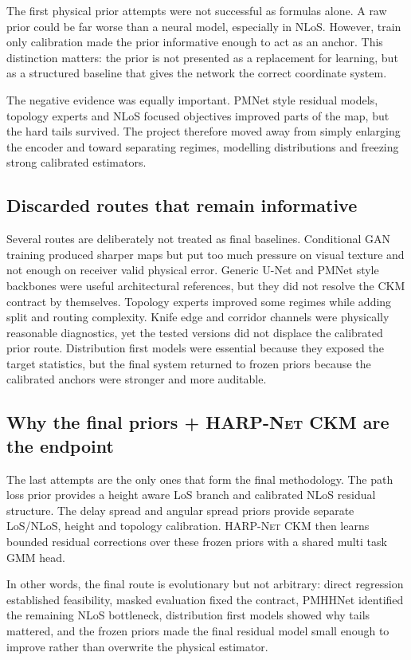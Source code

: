 The first physical prior attempts were not successful as formulas alone. A raw
prior could be far worse than a neural model, especially in NLoS. However,
train only calibration made the prior informative enough to act as an anchor.
This distinction matters: the prior is not presented as a replacement for
learning, but as a structured baseline that gives the network the correct
coordinate system.

The negative evidence was equally important. PMNet style residual models,
topology experts and NLoS focused objectives improved parts of the map, but
the hard tails survived. The project therefore moved away from simply enlarging
the encoder and toward separating regimes, modelling distributions and freezing
strong calibrated estimators.

\subsection{Discarded routes that remain informative}

Several routes are deliberately not treated as final baselines. Conditional GAN
training produced sharper maps but put too much pressure on visual texture and
not enough on receiver valid physical error. Generic U-Net and PMNet style
backbones were useful architectural references, but they did not resolve the
CKM contract by themselves. Topology experts improved some regimes while adding
split and routing complexity. Knife edge and corridor channels were physically
reasonable diagnostics, yet the tested versions did not displace the calibrated
prior route. Distribution first models were essential because they exposed the
target statistics, but the final system returned to frozen priors because the
calibrated anchors were stronger and more auditable.

\subsection{Why the final priors + \textsc{HARP-Net CKM} are the endpoint}

The last attempts are the only ones that form the final methodology. The
path loss prior provides a height aware LoS branch and calibrated NLoS residual
structure. The delay spread and angular spread priors provide separate
LoS/NLoS, height and topology calibration. \textsc{HARP-Net CKM} then learns
bounded residual corrections over these frozen priors with a shared multi task
GMM head.

In other words, the final route is evolutionary but not arbitrary: direct
regression established feasibility, masked evaluation fixed the contract,
PMHHNet identified the remaining NLoS bottleneck, distribution first models
showed why tails mattered, and the frozen priors made the final residual model
small enough to improve rather than overwrite the physical estimator.

